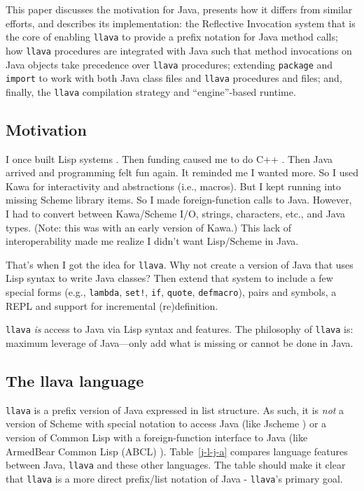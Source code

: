 \documentclass[final]{ieee}
\begin{document}
\PARstart This paper discusses the motivation for Java, presents how it differs
from similar efforts, and describes its implementation: the Reflective
Invocation system that is the core of enabling {\tt llava} to provide
a prefix notation for Java method calls; how {\tt llava} procedures
are integrated with Java such that method invocations on Java objects
take precedence over {\tt llava} procedures; extending {\tt package}
and {\tt import} to work with both Java class files and {\tt llava}
procedures and files; and, finally, the {\tt llava} compilation
strategy and ``engine''-based runtime.

\subsection{Motivation}

I once built Lisp systems \cite{LaSC5,LaSC3}.  Then funding caused me
to do C++ \cite{DC++}.  Then Java arrived and programming felt fun
again.  It reminded me I wanted more.  So I used Kawa \cite{kawa} for
interactivity and abstractions (i.e., macros).  But I kept running
into missing Scheme library items.  So I made foreign-function calls
to Java.  However, I had to convert between Kawa/Scheme I/O, strings,
characters, etc., and Java types.  (Note: this was with an early
version of Kawa.)  This lack of interoperability made me realize I
didn't want Lisp/Scheme in Java.

That's when I got the idea for {\tt llava}.  Why not create a version
of Java that uses Lisp syntax to write Java classes?  Then extend that
system to include a few special forms (e.g., {\tt lambda}, {\tt set!},
{\tt if}, {\tt quote}, {\tt defmacro}), pairs and symbols, a REPL
and support for incremental (re)definition.

{\tt llava} \emph{is} access to Java via Lisp syntax and features.
The philosophy of {\tt llava} is: maximum leverage of Java---only add
what is missing or cannot be done in Java.

\subsection{The llava language}
\label{the-llava-language}

{\tt llava} is a prefix version of Java expressed in list structure.
As such, it is \emph{not} a version of Scheme with special notation to
access Java (like Jscheme \cite{JschemeDot}) or a version of Common Lisp
with a foreign-function interface to Java (like ArmedBear Common Lisp
(ABCL) \cite{abcl}).  Table~\ref{j-l-j-a} compares language features
between Java, {\tt llava} and these other languages.  The table should
make it clear that {\tt llava} is a more direct prefix/list notation
of Java - {\tt llava}'s primary goal.
\end{document}
